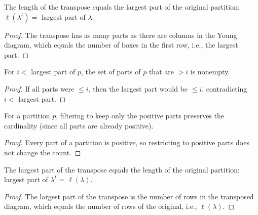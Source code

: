 \begin{lemma}
\label{lem.pars.transpose-length-eq-largestPart}
\leanhelper
\leanok
The length of the transpose equals the largest part of the original partition:
$\ell(\lambda^t) = $ largest part of $\lambda$.
\end{lemma}

\begin{proof}
\leanok
The transpose has as many parts as there are columns in the Young diagram,
which equals the number of boxes in the first row, i.e., the largest part.
\end{proof}

\begin{lemma}
\label{lem.pars.filter-card-pos-of-lt-largest}
\leanhelper
\leanok
For $i < $ largest part of $p$, the set of parts of $p$ that are $> i$ is nonempty.
\end{lemma}

\begin{proof}
If all parts were $\le i$, then the largest part would be $\le i$, contradicting
$i <$ largest part.
\end{proof}

\begin{lemma}
\label{lem.pars.filter-gt-zero-card-eq}
\leanhelper
\leanok
For a partition $p$, filtering to keep only the positive parts preserves the cardinality
(since all parts are already positive).
\end{lemma}

\begin{proof}
Every part of a partition is positive, so restricting to positive parts does not change the count.
\end{proof}

\begin{lemma}
\label{lem.pars.transpose-largestPart-eq-length}
\leanhelper
\leanok
The largest part of the transpose equals the length of the original partition:
largest part of $\lambda^t$ = $\ell(\lambda)$.
\end{lemma}

\begin{proof}
\leanok
The largest part of the transpose is the number of rows in the transposed diagram,
which equals the number of rows of the original, i.e., $\ell(\lambda)$.
\end{proof}

